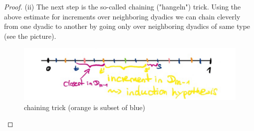 \begin{proof}[Proof]
		(ii) The next step is the so-called chaining ("hangeln") trick. Using the above estimate for increments over neighboring dyadics we can chain cleverly from one dyadic to another by going only over neighboring dyadics of same type (see the picture).
		\begin{figure}[h]
			\begin{center}
				\includegraphics[scale=0.07]{dyadic2.jpeg}
				\caption*{chaining trick (orange is subset of blue)}
			\end{center}
			\end{figure}
		

\end{proof}
